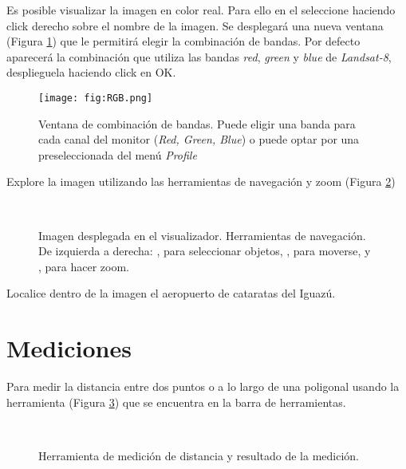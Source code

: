 Es posible visualizar la imagen en color real. Para ello en el  seleccione  haciendo click derecho sobre el nombre de la imagen. Se desplegará una nueva ventana (Figura \ref{fig:RGB}) que le permitirá elegir la combinación de bandas. Por defecto aparecerá la combinación que utiliza las bandas \emph{red}, \emph{green} y \emph{blue} de \emph{Landsat-8}, desplieguela haciendo click en OK.

\begin{figure}[h!]
    \centering
    \texttt{[image: fig:RGB.png]}
    \caption{Ventana de combinación de bandas. Puede eligir una banda para cada canal del monitor (\emph{Red, Green, Blue}) o puede optar por una preseleccionada del menú \emph{Profile}}
    \label{fig:RGB}
\end{figure}

Explore la imagen utilizando las herramientas de navegación y zoom (Figura \ref{fig:mono})

\begin{figure}[h!]
    \centering
    \\
    \caption{Imagen desplegada en el visualizador. Herramientas de navegación. De izquierda a derecha: , para seleccionar objetos, , para moverse, y , para hacer zoom.}
    \label{fig:mono}
\end{figure}

Localice dentro de la imagen el aeropuerto de cataratas del Iguazú.

\section{Mediciones}

Para medir la distancia entre dos puntos o a lo largo de una poligonal usando la herramienta  (Figura \ref{fig:distancia}) que se encuentra en la barra de herramientas.

\begin{figure}[h!]
    \centering
    \\
    \caption{Herramienta de medición de distancia  y resultado de la medición.}
    \label{fig:distancia}
\end{figure}

